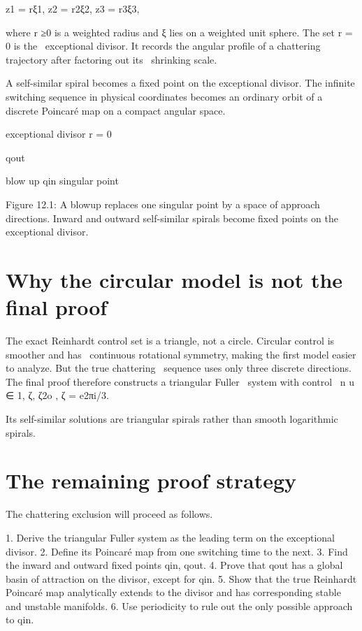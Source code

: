 \begin{displaytext}
z1 = rξ1, z2 = r2ξ2, z3 = r3ξ3,
\end{displaytext}

\begin{displaytext}
where r ≥0 is a weighted radius and ξ lies on a weighted unit sphere. The set r = 0 is the \
exceptional divisor. It records the angular profile of a chattering trajectory after factoring out its \
shrinking scale.
\end{displaytext}

A self-similar spiral becomes a fixed point on the exceptional divisor. The infinite switching sequence in physical coordinates becomes an ordinary orbit of a discrete Poincaré map on a compact angular space.


exceptional divisor r = 0


qout


blow up qin singular point


\begin{figureplaceholder}
Figure 12.1: A blowup replaces one singular point by a space of approach directions. Inward and outward self-similar spirals become fixed points on the exceptional divisor.
\end{figureplaceholder}

\section{Why the circular model is not the final proof}

\begin{displaytext}
The exact Reinhardt control set is a triangle, not a circle. Circular control is smoother and has \
continuous rotational symmetry, making the first model easier to analyze. But the true chattering \
sequence uses only three discrete directions. The final proof therefore constructs a triangular Fuller \
system with control \
n u ∈ 1, ζ, ζ2o , ζ = e2πi/3.
\end{displaytext}

Its self-similar solutions are triangular spirals rather than smooth logarithmic spirals.


\section{The remaining proof strategy}

The chattering exclusion will proceed as follows.


1. Derive the triangular Fuller system as the leading term on the exceptional divisor. 2. Define its Poincaré map from one switching time to the next. 3. Find the inward and outward fixed points qin, qout. 4. Prove that qout has a global basin of attraction on the divisor, except for qin. 5. Show that the true Reinhardt Poincaré map analytically extends to the divisor and has corresponding stable and unstable manifolds. 6. Use periodicity to rule out the only possible approach to qin.


